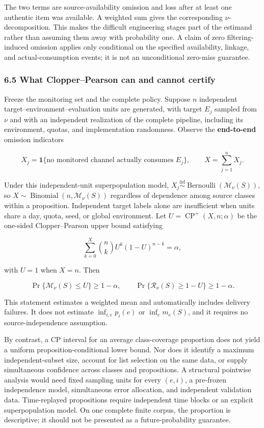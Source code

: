 \documentclass[
  11pt]{article}
\begin{document}
The two terms are source-availability omission and loss after at least
one authentic item was available. A weighted sum gives the corresponding
\(\nu\)-decomposition. This makes the difficult engineering stages part
of the estimand rather than assuming them away with probability one. A
claim of zero filtering-induced omission applies only conditional on the
specified availability, linkage, and actual-consumption events; it is
not an unconditional zero-miss guarantee.

\subsubsection{6.5 What Clopper--Pearson can and cannot
certify}\label{what-clopperpearson-can-and-cannot-certify}

Freeze the monitoring set and the complete policy. Suppose \(n\)
independent target--environment--evaluation units are generated, with
target \(E_j\) sampled from \(\nu\) and with an independent realization
of the complete pipeline, including its environment, quotas, and
implementation randomness. Observe the \textbf{end-to-end} omission
indicators

\[X_j=\mathbf 1\{\text{no monitored channel actually consumes }E_j\},\qquad X=\sum_{j=1}^nX_j.\]

Under this independent-unit superpopulation model,
\(X_j\overset{\mathrm{iid}}{\sim}\operatorname{Bernoulli}(\mathcal M_\nu(S))\),
so \(X\sim\operatorname{Binomial}(n,\mathcal M_\nu(S))\) regardless of
dependence among source classes within a proposition. Independent target
labels alone are insufficient when units share a day, quota, seed, or
global environment. Let \(U=\operatorname{CP}^+(X,n;\alpha)\) be the
one-sided Clopper--Pearson upper bound satisfying

\[\sum_{k=0}^{X}\binom nk U^k(1-U)^{n-k}=\alpha,\]

with \(U=1\) when \(X=n\). Then

\[\Pr\{\mathcal M_\nu(S)\le U\}\ge1-\alpha,\qquad
\Pr\{\mathcal R_\nu(S)\ge1-U\}\ge1-\alpha.\]

This statement estimates a weighted mean and automatically includes
delivery failures. It does not estimate \(\inf_{i,e}p_i(e)\) or
\(\inf_e m_e(S)\), and it requires no source-independence assumption.

By contrast, a CP interval for an average class-coverage proportion does
not yield a uniform proposition-conditional lower bound. Nor does it
identify a maximum independent-subset size, account for list selection
on the same data, or supply simultaneous confidence across classes and
propositions. A structural pointwise analysis would need fixed sampling
units for every \((e,i)\), a pre-frozen independence model, simultaneous
error allocation, and independent validation data. Time-replayed
propositions require independent time blocks or an explicit
superpopulation model. On one complete finite corpus, the proportion is
descriptive; it should not be presented as a future-probability
guarantee.
\end{document}
